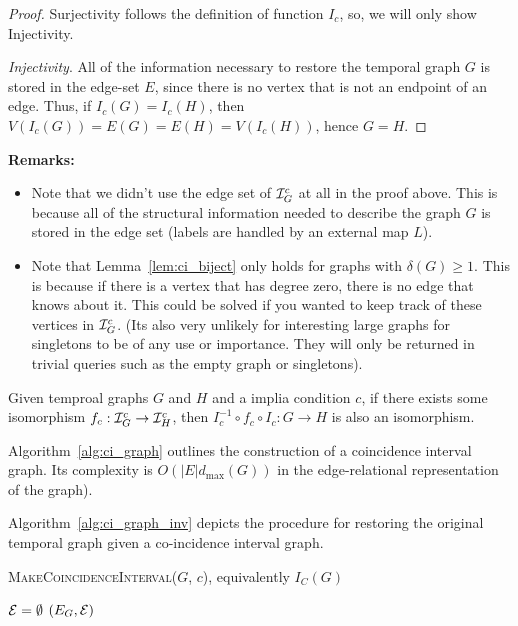 \begin{proof}[Proof] Surjectivity follows the definition of function $I_c$, so,
  we will only show Injectivity.
  
  \textit{Injectivity}. All of the information necessary to restore the temporal
  graph $G$ is stored in the edge-set $E$, since there is no vertex that is not
  an endpoint of an edge. Thus, if $I_c(G) = I_c(H)$, then $V(I_c(G)) = E(G) =
  E(H) = V(I_c(H))$, hence $G = H$.
\end{proof}

\clearpage
\noindent \textbf{Remarks:}
\begin{itemize}
  \item Note that we didn't use the edge set of $\mathcal{I}^c_G$ at all in the proof
    above. This is because all of the structural information needed to describe
    the graph $G$ is stored in the edge set (labels are handled by an external
    map $L$).
  \item Note that Lemma~\ref{lem:ci_biject} only holds for graphs with
    $\delta(G) \geq 1$. This is because if there is a vertex that has degree
    zero, there is no edge that knows about it. This could be solved if you
    wanted to keep track of these vertices in $\mathcal{I}^c_G$. (Its also very unlikely
    for interesting large graphs for singletons to be of any use or
    importance. They will only be returned in trivial queries such as the empty
    graph or singletons).
\end{itemize}

\begin{corollary} Given temproal graphs $G$ and $H$ and a implia condition $c$, if there exists some
isomorphism $f_c : \mathcal{I}^c_G \to \mathcal{I}^c_H$, then $I_c^{-1} \circ f_c \circ I_c : G
\to H$ is also an isomorphism.
\end{corollary}


Algorithm~\ref{alg:ci_graph} outlines the  construction of a coincidence interval 
graph. Its complexity  is $O(|E|d_{\max}(G))$ in the
edge-relational representation of the graph). 

Algorithm~\ref{alg:ci_graph_inv} depicts the procedure for restoring the original temporal graph given a co-incidence interval graph. 


\begin{algorithm}
  \label{alg:ci_graph}
  \caption{\textsc{MakeCoincidenceInterval($G$, $c$)}, equivalently $I_C(G)$}
  \SetAlgoLined

  $\mathcal{E} = \emptyset$\;
  \Return $(E_G, \mathcal{E})$\;
\end{algorithm}

